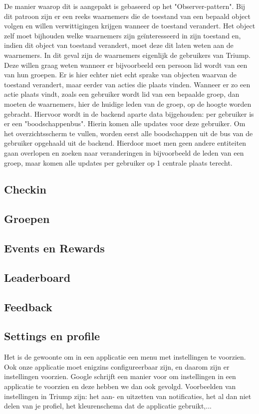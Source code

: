 De manier waarop dit is aangepakt is gebaseerd op het "Observer-pattern". Bij dit patroon zijn er een reeks waarnemers die de toestand van een bepaald object volgen 
en willen verwittigingen krijgen wanneer de toestand verandert. 
Het object zelf moet bijhouden welke waarnemers zijn geïnteresseerd in zijn toestand en, indien dit object van toestand verandert, moet deze dit laten weten aan de waarnemers.
In dit geval zijn de waarnemers eigenlijk de gebruikers van Triump. Deze willen graag weten wanneer er bijvoorbeeld een persoon lid wordt van een van hun groepen.
Er is hier echter niet echt sprake van objecten waarvan de toestand verandert, maar eerder van acties die plaats vinden. Wanneer er zo een actie plaats vindt, zoals een gebruiker wordt lid van een bepaalde groep,
dan moeten de waarnemers, hier de huidige leden van de groep, op de hoogte worden gebracht.
Hiervoor wordt in de backend aparte data bijgehouden: per gebruiker is er een "boodschappenbus". Hierin komen alle updates voor deze gebruiker. Om het overzichtsscherm te vullen, worden eerst alle boodschappen uit de bus van de gebruiker opgehaald uit de backend. Hierdoor moet men geen andere entiteiten gaan overlopen en zoeken naar veranderingen in bijvoorbeeld de leden van een groep, maar komen alle updates per gebruiker op 1 centrale plaats terecht.

\subsection{Checkin}%
\subsection{Groepen}%
\subsection{Events en Rewards}%
\subsection{Leaderboard}%
\subsection{Feedback}%
\subsection{Settings en profile}%

Het is de gewoonte om in een applicatie een menu met instellingen te voorzien. Ook onze applicatie moet enigzins configureerbaar zijn, en daarom zijn er instellingen voorzien.
Google schrijft een manier voor om instellingen in een applicatie te voorzien %
en deze hebben we dan ook gevolgd. Voorbeelden van instellingen in Triump zijn: het aan- en uitzetten van notificaties, het al dan niet delen van je profiel, het kleurenschema dat de applicatie gebruikt,...

